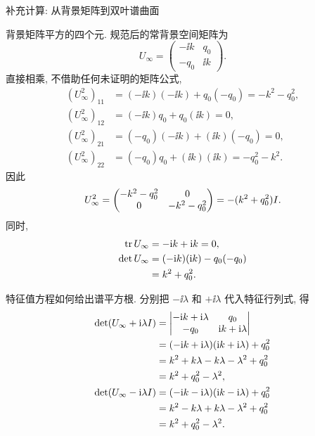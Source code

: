 \par\medskip\noindent 补充计算: 从背景矩阵到双叶谱曲面\par
\par\smallskip\noindent 背景矩阵平方的四个元.\quad
规范后的常背景空间矩阵为
\begin{equation*}
U_\infty=
\begin{pmatrix}-\ii k&q_0\\-q_0&\ii k\end{pmatrix}.
\end{equation*}
直接相乘, 不借助任何未证明的矩阵公式,
\begin{align*}
(U_\infty^2)_{11}
&=(-\ii k)(-\ii k)+q_0(-q_0)
=-k^2-q_0^2,\\
(U_\infty^2)_{12}
&=(-\ii k)q_0+q_0(\ii k)=0,\\
(U_\infty^2)_{21}
&=(-q_0)(-\ii k)+(\ii k)(-q_0)=0,\\
(U_\infty^2)_{22}
&=(-q_0)q_0+(\ii k)(\ii k)
=-q_0^2-k^2.
\end{align*}
因此
\begin{equation*}
U_\infty^2
=\begin{pmatrix}-k^2-q_0^2&0\\0&-k^2-q_0^2\end{pmatrix}
=-(k^2+q_0^2)I.
\end{equation*}
同时,
\begin{align*}
\operatorname{tr} U_\infty&=-\mathrm{i} k+\mathrm{i} k=0,\\
\det U_\infty
&=(-\mathrm{i} k)(\mathrm{i} k)-q_0(-q_0)\\
&=k^2+q_0^2.
\end{align*}
\par\smallskip\noindent 特征值方程如何给出谱平方根.\quad
分别把 $-\ii\lambda$ 和 $+\ii\lambda$ 代入特征行列式, 得
\begin{align*}
\det(U_\infty+\mathrm{i}\lambda I)
&=\begin{vmatrix}
-\mathrm{i} k+\mathrm{i}\lambda&q_0\\-q_0&\mathrm{i} k+\mathrm{i}\lambda
\end{vmatrix}\\
&=(-\mathrm{i} k+\mathrm{i}\lambda)(\mathrm{i} k+\mathrm{i}\lambda)+q_0^2\\
&=k^2+k\lambda-k\lambda-\lambda^2+q_0^2\\
&=k^2+q_0^2-\lambda^2,\\
\det(U_\infty-\mathrm{i}\lambda I)
&=(-\mathrm{i} k-\mathrm{i}\lambda)(\mathrm{i} k-\mathrm{i}\lambda)+q_0^2\\
&=k^2-k\lambda+k\lambda-\lambda^2+q_0^2\\
&=k^2+q_0^2-\lambda^2.
\end{align*}
